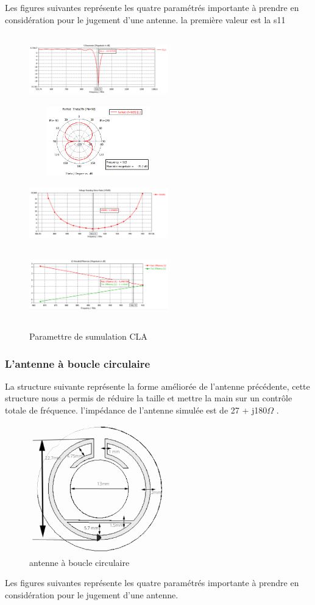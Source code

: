 \documentclass[11pt, a4paper, twoside]{book}
\begin{document}
Les figures suivantes représente les quatre paramétrés importante  à prendre en considération pour le jugement d'une antenne. la première valeur est la s11
\begin{figure}[h]
\centering
\includegraphics[width=6cm,height=3cm]{clas11}
\includegraphics[width=6cm,height=3cm]{clapolfarfield}
\includegraphics[width=6cm,height=3cm]{clavswr}
\includegraphics[width=6cm,height=3cm]{claefficency}
\caption{Paramettre de sumulation CLA}
\end{figure} 

\subsubsection{L'antenne à boucle circulaire}
La structure suivante représente  la forme améliorée de l'antenne précédente, cette structure nous a permis de réduire la taille et mettre la main sur un contrôle totale de fréquence. l'impédance de l'antenne simulée est  de 27 + j180\(\Omega\)
.
\begin{figure}[H]
\centering
\includegraphics[width=6cm]{1STee}
\caption{antenne à boucle circulaire}
\end{figure}
Les figures suivantes représente les quatre paramétrés importante à prendre en considération pour le jugement d'une antenne.
\end{document}
